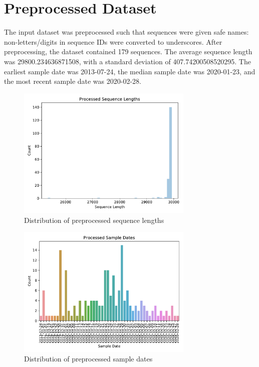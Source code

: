 \documentclass{article}
\begin{document}
\section{Preprocessed Dataset}
The input dataset was preprocessed such that sequences were given safe names: non-letters/digits in sequence IDs were converted to underscores.
After preprocessing, the dataset contained 179 sequences.
The average sequence length was 29800.234636871508,
with a standard deviation of 407.74200508520295.
The earliest sample date was 2013-07-24,
the median sample date was 2020-01-23,
and the most recent sample date was 2020-02-28.


\begin{figure}[h]
\centering
\includegraphics[width=0.75\textwidth]{./figs/processed_sequence_lengths.pdf}
\caption{Distribution of preprocessed sequence lengths}
\end{figure}



\begin{figure}[h]
\centering
\includegraphics[width=0.75\textwidth]{./figs/processed_sample_dates.pdf}
\caption{Distribution of preprocessed sample dates}
\end{figure}
\end{document}
